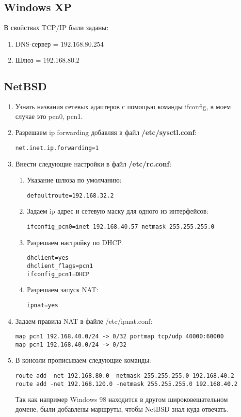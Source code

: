 \documentclass[a4paper, 12pt]{article}		%
\begin{document}
\subsection{Windows XP}
В свойствах TCP/IP были заданы:
\begin{enumerate}
\item DNS-сервер = 192.168.80.254
\item Шлюз = 192.168.80.2
\end{enumerate}

\subsection{NetBSD}
\begin{enumerate}
\item Узнать названия сетевых адаптеров с помощью команды ifconfig, в моем случае это pcn0, pcn1.
\item Разрешаем ip forwarding добавляя в файл \textbf{/etc/sysctl.conf}:
\begin{lstlisting}[language={}]
net.inet.ip.forwarding=1
\end{lstlisting}
\item Внести следующие настройки в файл \textbf{/etc/rc.conf}:
\begin{enumerate}
\item Указание шлюза по умолчанию:
\begin{lstlisting}[language={}]
defaultroute=192.168.32.2
\end{lstlisting}
\item Задаем ip адрес и сетевую маску для одного из интерфейсов:
\begin{lstlisting}[language={}]
ifconfig_pcn0=inet 192.168.40.57 netmask 255.255.255.0
\end{lstlisting}
\item Разрешаем настройку по DHCP.
\begin{lstlisting}[language={}]
dhclient=yes	
dhclient_flags=pcn1
ifconfig_pcn1=DHCP
\end{lstlisting}
\item Разрешаем запуск NAT:
\begin{lstlisting}[language={}]
ipnat=yes
\end{lstlisting}
\end{enumerate}

\item Задаем правила NAT в файле /etc/ipnat.conf:
\begin{lstlisting}[language={}]
map pcn1 192.168.40.0/24 -> 0/32 portmap tcp/udp 40000:60000
map pcn1 192.168.40.0/24 -> 0/32
\end{lstlisting}
\item В консоли прописываем следующие команды:
\begin{lstlisting}[language={}]
route add -net 192.168.80.0 -netmask 255.255.255.0 192.168.40.2
route add -net 192.168.120.0 -netmask 255.255.255.0 192.168.40.2
\end{lstlisting}
Так как например Windows 98 находится в другом широковещательном домене, были добавлены маршруты, чтобы NetBSD знал куда отвечать.
\end{enumerate}
\end{document}
